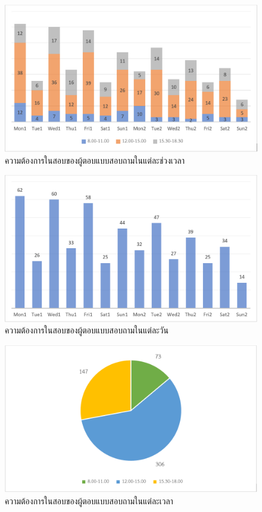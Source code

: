 \begin{figure}
\begin{center}
\includegraphics[width=\linewidth]{images/bar_chart.png}
\end{center}
\caption[Poem]{ความต้องการในสอบของผู้ตอบแบบสอบถามในแต่ละช่วงเวลา}
\label{fig:time_slot}     
\end{figure}

\begin{figure}
\begin{center}
\includegraphics[width=\linewidth]{images/chart.png}
\end{center}
\caption[Poem]{ความต้องการในสอบของผู้ตอบแบบสอบถามในแต่ละวัน}
\label{fig:day}     
\end{figure}

\begin{figure}
\begin{center}
\includegraphics[width=\linewidth]{images/pie.png}
\end{center}
\caption[Poem]{ความต้องการในสอบของผู้ตอบแบบสอบถามในแต่ละเวลา}
\label{fig:time}     
\end{figure}


